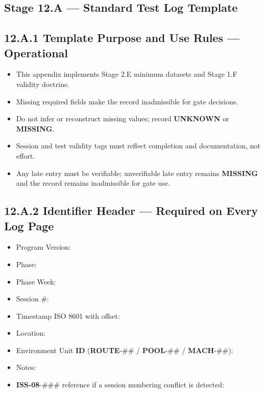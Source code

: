 \documentclass[10pt]{article}
\begin{document}
\begin{landscape}
    
\section*{Stage 12.A — Standard Test Log Template}
{}

\subsection*{12.A.1 Template Purpose and Use Rules — Operational}
{}

\begin{itemize}
\item This appendix implements Stage 2.E minimum datasets and Stage 1.F validity doctrine.
\item Missing required fields make the record inadmissible for gate decisions.
\item Do not infer or reconstruct missing values; record \textbf{UNKNOWN} or \textbf{MISSING}.
\item Session and test validity tags must reflect completion and documentation, not effort.
\item Any late entry must be verifiable; unverifiable late entry remains \textbf{MISSING} and the record remains inadmissible for gate use.
\end{itemize}

\subsection*{12.A.2 Identifier Header — Required on Every Log Page}
{}

\begin{itemize}
\item Program Version:
\item Phase:
\item Phase Week:
\item Session \#:
\item Timestamp ISO 8601 with offset:
\item Location:
\item Environment Unit \textbf{ID} (\textbf{ROUTE}-\#\# / \textbf{POOL}-\#\# / \textbf{MACH}-\#\#):
\item Notes:
\item \textbf{ISS-08}-\#\#\# reference if a session numbering conflict is detected:
\end{itemize}


\end{landscape}
\end{document}
